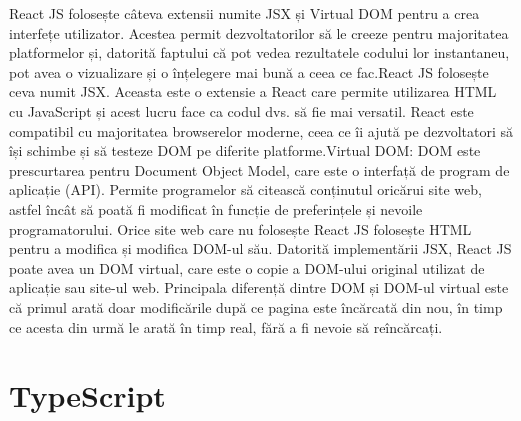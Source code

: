 \par React JS folosește câteva extensii numite JSX și Virtual DOM pentru a crea interfețe utilizator. Acestea permit dezvoltatorilor să le creeze pentru majoritatea platformelor și, datorită faptului că pot vedea rezultatele codului lor instantaneu, pot avea o vizualizare și o înțelegere mai bună a ceea ce fac.React JS folosește ceva numit JSX. Aceasta este o extensie a React care permite utilizarea HTML cu JavaScript și acest lucru face ca codul dvs. să fie mai versatil. React este compatibil cu majoritatea browserelor moderne, ceea ce îi ajută pe dezvoltatori să își schimbe și să testeze DOM pe diferite platforme.Virtual DOM: DOM este prescurtarea pentru Document Object Model, care este o interfață de program de aplicație (API). Permite programelor să citească conținutul oricărui site web, astfel încât să poată fi modificat în funcție de preferințele și nevoile programatorului. Orice site web care nu folosește React JS folosește HTML pentru a modifica și modifica DOM-ul său.
Datorită implementării JSX, React JS poate avea un DOM virtual, care este o copie a DOM-ului original utilizat de aplicație sau site-ul web. Principala diferență dintre DOM și DOM-ul virtual este că primul arată doar modificările după ce pagina este încărcată din nou, în timp ce acesta din urmă le arată în timp real, fără a fi nevoie să reîncărcați.

\section{TypeScript}
\label{sec:ch4sec2}

